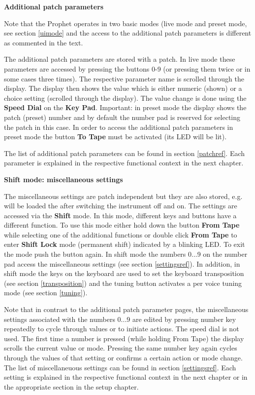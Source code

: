\documentclass[draft,landscape, 11pt, oneside]{report}
\newenvironment{flowtext}{\addmargin[0cm]{7cm}}{\endaddmargin} %
\begin{document}
\begin{flowtext}
\textbf{Additional patch parameters}

Note that the Prophet operates in two basic modes (live mode and preset mode, see section \ref{uimode} and the access to the additional patch parameters is different as commented in the text.

The additional patch parameters are stored with a patch. In live mode these parameters are accessed by pressing the buttons 0-9 (or pressing them twice or in some cases three times). The respective parameter name is scrolled through the display. The display then shows the value which is either numeric (shown) or a choice setting (scrolled through the display). The value change is done using the \textbf{Speed Dial} on the \textbf{Key Pad}. Important: in preset mode the display shows the patch (preset) number and by default the number pad is reserved for selecting the patch in this case. In order to access the additional patch parameters in preset mode the button \textbf{To Tape} must be activated (its LED will be lit).
       
The list of additional patch parameters can be found in section \ref{patchref}. Each parameter is explained in the respective functional context in the next chapter.

\textbf{Shift mode: miscellaneous settings}

The miscellaneous settings are patch independent but they are also stored, e.g. will be loaded the after switching the instrument off and on. The settings are accessed via the \textbf{Shift} mode. In this mode, different keys and buttons have a different function. To use this mode either hold down the button \textbf{From Tape} while selecting one of the additional functions or double click \textbf{From Tape} to enter \textbf{Shift Lock} mode (permanent shift) indicated by a blinking LED. To exit the mode push the button again. In shift mode the numbers 0...9 on the number pad access the miscellaneous settings (see section \ref{settingsref}). In addition, in shift mode the keys on the keyboard are used to set the keyboard transposition (see section \ref{transposition}) and the tuning button activates a per voice tuning mode (see section \ref{tuning}).

Note that in contrast to the additional patch parameter pages, the miscellaneous settings associated with the numbers 0...9 are edited by pressing number key repeatedly to cycle through values or to initiate actions. The speed dial is not used. The first time a number is pressed (while holding From Tape) the display scrolls the current value or mode. Pressing the same number key again cycles through the values of that setting or confirms a certain action or mode change. The list of miscellaneuous settings can be found in section \ref{settingsref}. Each setting is explained in the respective functional context in the next chapter or in the appropriate section in the setup chapter.


\end{flowtext}
\end{document}
